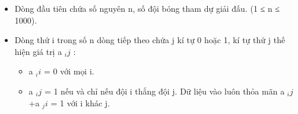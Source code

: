 \begin{itemize}
	\item Dòng đầu tiên chứa số nguyên n, số đội bóng tham dự giải đấu. (1 ≤ n ≤ 1000).
	\item Dòng thứ i trong số n dòng tiếp theo chứa j kí tự 0 hoặc 1, kí tự thứ j thế hiện giá trị a $_ ij $ :
\begin{itemize}
	\item a $_ ii $ = 0 với mọi i.
	\item a $_ ij $ = 1 nếu và chỉ nếu đội i thắng đội j. Dữ liệu vào luôn thỏa mãn a $_ ij $ +a $_ ji $ = 1 với i khác j.
\end{itemize}
\end{itemize}